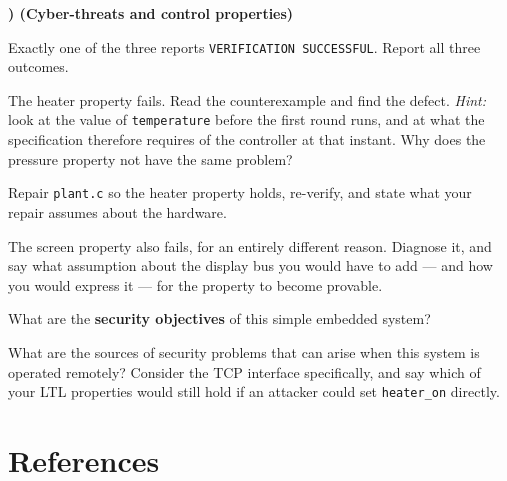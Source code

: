 \documentclass[11pt,a4paper]{article}
\newcommand{\file}[1]{\texttt{\small #1}}
\newcounter{exc}
\newenvironment{exercise}[1]
  {\stepcounter{exc}\medskip\noindent\textbf{\theexc) (#1)}\par\nopagebreak\smallskip}
  {\par\medskip}
\begin{document}
\begin{exercise}{Cyber-threats and control properties}
\begin{parts}
        Exactly one of the three reports
        \texttt{VERIFICATION SUCCESSFUL}. Report all three outcomes.
  \item The heater property fails. Read the counterexample and find the defect.
        \emph{Hint:} look at the value of \texttt{temperature} before the first
        round runs, and at what the specification therefore requires of the
        controller at that instant. Why does the pressure property not have the
        same problem?
  \item Repair \file{plant.c} so the heater property holds, re-verify, and state
        what your repair assumes about the hardware.
  \item The screen property also fails, for an entirely different reason.
        Diagnose it, and say what assumption about the display bus you would
        have to add --- and how you would express it --- for the property to
        become provable.
  \item What are the \textbf{security objectives} of this simple embedded
        system?
  \item What are the sources of security problems that can arise when this
        system is operated remotely? Consider the TCP interface specifically,
        and say which of your LTL properties would still hold if an attacker
        could set \texttt{heater\_on} directly.
\end{parts}
\end{exercise}

\section*{References}
\end{document}
